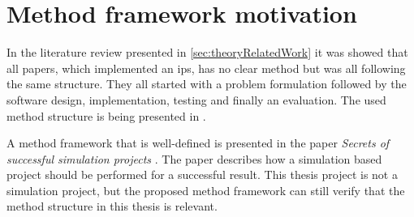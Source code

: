 \section{Method framework motivation}\label{sec:methodFramework}
In the literature review presented in \cref{sec:theoryRelatedWork} it was showed that  all papers, which implemented an \acrfull{ips}, has no clear method but was all following the same structure.
They all started with a problem formulation followed by the software design, implementation, testing and finally an evaluation.
The used method structure is being presented in .


A method framework that is well-defined is presented in the paper \textit{Secrets of successful simulation projects} \cite{SecretsSuccessfulSimulation1995}.
The paper describes how a simulation based project should be performed for a successful result.
This thesis project is not a simulation project, but the proposed method framework can still verify that the method structure in this thesis is relevant.
